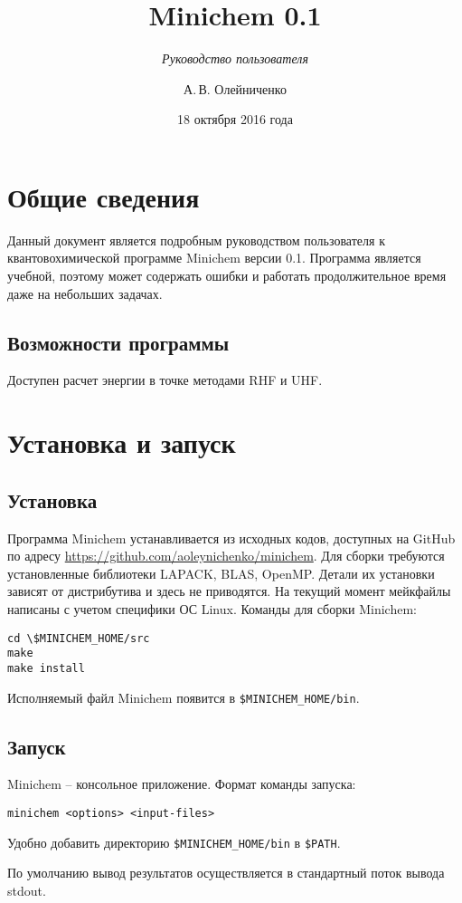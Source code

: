 \documentclass[a4paper]{book}
\title{Minichem 0.1}
\subtitle{\textit{Руководство пользователя}}
\author{А.\,В. Олейниченко}
\date{18 октября 2016 года}
\begin{document}
\maketitle

\chapter{Общие сведения}
Данный документ является подробным руководством пользователя к квантовохимической программе Minichem версии 0.1.
Программа является учебной, поэтому может содержать ошибки и работать продолжительное время даже на небольших задачах.

\section{Возможности программы}
Доступен расчет энергии в точке методами RHF и UHF.

\chapter{Установка и запуск}
\section{Установка}
Программа Minichem устанавливается из исходных кодов, доступных на GitHub по адресу \url{https://github.com/aoleynichenko/minichem}.
Для сборки требуются установленные библиотеки LAPACK, BLAS, OpenMP. Детали их установки зависят от дистрибутива и здесь не приводятся.
На текущий момент мейкфайлы написаны с учетом специфики ОС Linux.
Команды для сборки Minichem:

\begin{lstlisting}
cd \$MINICHEM_HOME/src
make
make install
\end{lstlisting}
Исполняемый файл Minichem появится в \texttt{\$MINICHEM\_HOME/bin}.

\section{Запуск}
Minichem -- консольное приложение. Формат команды запуска:
\begin{lstlisting}
minichem <options> <input-files>
\end{lstlisting}
Удобно добавить директорию \texttt{\$MINICHEM\_HOME/bin} в \texttt{\$PATH}.

По умолчанию вывод результатов осуществляется в стандартный поток вывода stdout.
\end{document}
